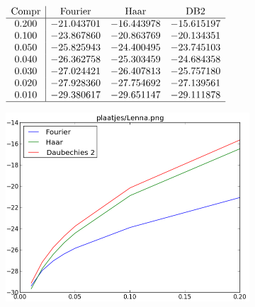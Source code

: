 \begin{figure}
  \centering
  \begin{subfigure}[t]{0.48\textwidth}
    \centering
    \vspace{10pt}
    \begingroup

    \renewcommand*{\arraystretch}{1.5}
    $\begin{array}{c | c c c c}
      \text{Compr} & \text{Fourier} & \text{Haar} & \text{DB2} \\ \hline
      0.200 & -21.043701 & -16.443978 & -15.615197 \\
      0.100 & -23.867860 & -20.863769 & -20.134351 \\
      0.050 & -25.825943 & -24.400495 & -23.745103 \\
      0.040 & -26.362758 & -25.303459 & -24.684358 \\
      0.030 & -27.024421 & -26.407813 & -25.757180 \\
      0.020 & -27.928360 & -27.754692 & -27.139561 \\
      0.010 & -29.380617 & -29.651147 & -29.111878 \\ \hline
    \end{array}$
    \endgroup
  \end{subfigure}
  \begin{subfigure}[t]{0.48\textwidth}
    \centering
    \vspace{0pt}
    \includegraphics[height=\textwidth]{plaatjes/grafiek_Lenna_0_15-0_01.png}
  \end{subfigure}
\end{figure}
\restoregeometry
\pagebreak

